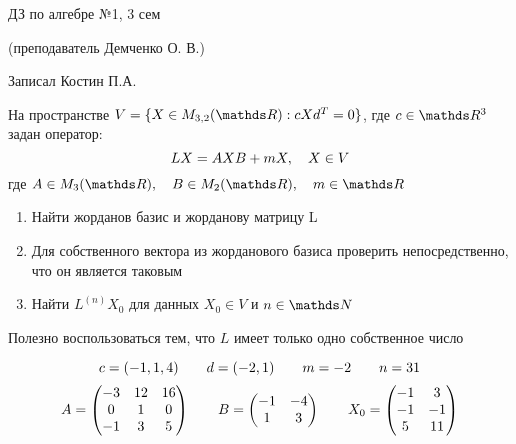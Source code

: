 \documentclass[11pt, fleqn]{article}
\begin{document}
\begin{center}
  \huge ДЗ по алгебре №1, 3 сем

  \Large (преподаватель Демченко О. В.)

  \large Записал Костин П.А.
\end{center}

\begin{task}
  На пространстве $V = \{ X \in M_{3,2}(\R): c X d^T = 0\}$, где $c \in \R^3$ задан оператор:
  \[LX = AXB + mX,\quad X \in V\]
  где $A \in M_3(\R),\q B \in M_2(\R),\q m \in \R$
  \begin{enumerate}
    \item Найти жорданов базис и жорданову матрицу L
    \item Для собственного вектора из жорданового базиса проверить непосредственно, что он является таковым
    \item Найти $L^{(n)}X_0$ для данных $X_0 \in V$ и $n \in \N$
  \end{enumerate}
  Полезно воспользоваться тем, что $L$ имеет только одно собственное число
\end{task}

\begin{Remark}
  \[c = (-1,1,4) \qquad d = (-2,1) \qquad m = -2 \qquad n = 31\]
  \[A = \begin{pmatrix}
    -3 & 12 & 16\\
    0 & 1 & 0\\
    -1 & 3 & 5
  \end{pmatrix} \qquad B = \begin{pmatrix}
    -1 & -4\\
    1 & 3
  \end{pmatrix} \qquad X_0 = \begin{pmatrix}
    -1 & 3\\
    -1 & -1\\
    5 & 11
  \end{pmatrix}\]
\end{Remark}
\end{document}
